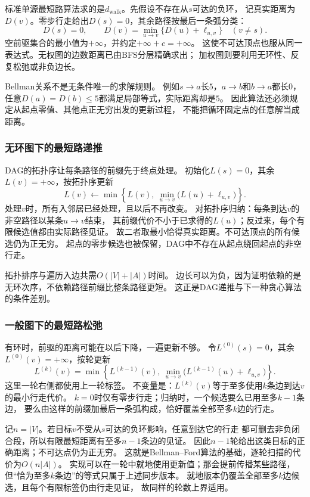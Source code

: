 标准单源最短路算法求的是\(d_{\mathrm{walk}}\)。先假设不存在从\(s\)可达的负环，
记真实距离为\(D(v)\)。零步行走给出\(D(s)=0\)，其余路径按最后一条弧分类：
\begin{equation}
  D(s)=0,\qquad
  D(v)=\min_{u\to v}\{D(u)+\ell_{u,v}\}\quad(v\neq s).
  \label{eq:graph-theory-shortest-path-bellman}
\end{equation}
空前驱集合的最小值为\(+\infty\)，并约定\(+\infty+c=+\infty\)。
这使不可达顶点也服从同一表达式。无权图的边数距离已由BFS分层精确求出；
加权图则要利用无环性、反复松弛或非负边长。

Bellman关系不是无条件唯一的求解规则。
例如\(s\to a\)长\(5\)，\(a\to b\)和\(b\to a\)都长\(0\)，
任意\(D(a)=D(b)\leq5\)都满足局部等式，实际距离却是\(5\)。
因此算法还必须规定从起点零值、其他点正无穷出发的更新过程，
不能把循环固定点的任意解当成距离。

\subsubsection{无环图下的最短路递推}

DAG的拓扑序让每条路径的前缀先于终点处理。
初始化\(L(s)=0\)，其余\(L(v)=+\infty\)，按拓扑序更新
\[
  L(v)\leftarrow
  \min\left\{L(v),\ \min_{u\to v}\bigl(L(u)+\ell_{u,v}\bigr)\right\}.
\]
处理\(v\)时，所有入邻居已经处理，且以后不再改变。
对拓扑序归纳：每条到达\(v\)的非空路径以某条\(u\to v\)结束，
其前缀代价不小于已求得的\(L(u)\)；反过来，每个有限候选值都由实际路径见证。
故二者取最小恰得真实距离。不可达顶点的所有候选仍为正无穷。
起点的零步候选也被保留，DAG中不存在从起点绕回起点的非空行走。

拓扑排序与遍历入边共需\(O(|V|+|A|)\)时间。
边长可以为负，因为证明依赖的是无环次序，不依赖路径前缀比整条路径更短。
这正是DAG递推与下一种贪心算法的条件差别。

\subsubsection{一般图下的最短路松弛}

有环时，前驱的距离可能在以后下降，一遍更新不够。
令\(L^{(0)}(s)=0\)，其余\(L^{(0)}(v)=+\infty\)，按轮更新
\[
  L^{(k)}(v)=
  \min\left\{
    L^{(k-1)}(v),\
    \min_{u\to v}\bigl(L^{(k-1)}(u)+\ell_{u,v}\bigr)
  \right\}.
\]
这里一轮右侧都使用上一轮标签。
不变量是：\(L^{(k)}(v)\)等于至多使用\(k\)条边到达\(v\)的最小行走代价。
\(k=0\)时仅有零步行走；归纳时，一个候选要么已用至多\(k-1\)条边，
要么由这样的前缀加最后一条弧构成，恰好覆盖全部至多\(k\)边的行走。

记\(n=|V|\)。若目标\(v\)不受从\(s\)可达的负环影响，任意到达它的行走
都可删去非负闭合段，所以有限最短距离有至多\(n-1\)条边的见证。
因此\(n-1\)轮给出这类目标的正确距离；不可达点仍为正无穷。
这就是Bellman--Ford算法的基础，逐轮扫描的代价为\(O(n|A|)\)。
实现可以在一轮中就地使用更新值；那会提前传播某些路径，
但“恰为至多\(k\)条边”的等式只属于上述同步版本。
就地版本仍覆盖全部至多\(k\)边候选，且每个有限标签仍由行走见证，
故同样的轮数上界适用。

